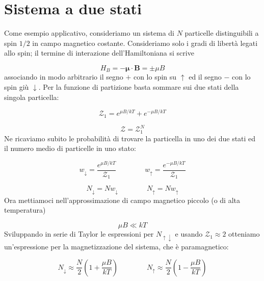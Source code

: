 \documentclass[a4paper]{report}
\begin{document}
\section{Sistema a due stati}

Come esempio applicativo, consideriamo un sistema di $N$ particelle distinguibili a spin $1/2$ in campo magnetico costante. Consideriamo solo i gradi di libertà legati allo spin; il termine di interazione dell'Hamiltoniana si scrive

\begin{equation}
    H_B = - \boldsymbol{\mu}\cdot \mathbf{B} = \pm \mu B
\end{equation}
associando in modo arbitrario il segno $+$ con lo spin su $\uparrow$ ed il segno $-$ con lo spin giù $\downarrow$. Per la funzione di partizione basta sommare sui due stati della singola particella:

\begin{equation}
    \mathcal{Z}_1 = e^{\mu B/k T} + e^{-\mu B/k T}
\end{equation}

\begin{equation}
    \mathcal{Z} = \mathcal{Z}_{1}^{N}
\end{equation}
Ne ricaviamo subito le probabilità di trovare la particella in uno dei due stati ed il numero medio di particelle in uno stato:

\begin{equation}
    w_{\downarrow} = \frac{e^{\mu B/k T}}{\mathcal{Z}_1} \qquad\qquad  w_{\uparrow} = \frac{e^{-\mu B/k T}}{\mathcal{Z}_1}
\end{equation}

\begin{equation}
    N_{\downarrow} = N w_{\downarrow}  \qquad \qquad N_{\uparrow} = N w_{\uparrow}
\end{equation}
Ora mettiamoci nell'approssimazione di campo magnetico piccolo (o di alta temperatura)

\begin{equation}
    \mu B \ll k T
\end{equation}
Sviluppando in serie di Taylor le espressioni per $N_{\uparrow\downarrow}$ e usando $\mathcal{Z}_1 \approx 2$ otteniamo un'espressione per la magnetizzazione del sistema, che è paramagnetico:

\begin{equation}
    N_{\downarrow} \approx \frac{N}{2}\left(1+\frac{\mu B}{k T}\right) \qquad \qquad N_{\uparrow} \approx \frac{N}{2}\left(1-\frac{\mu B}{k T}\right)
\end{equation}
\end{document}
